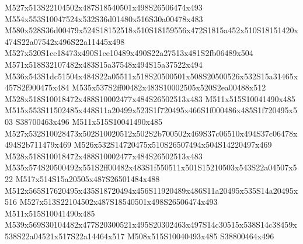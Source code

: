\documentclass{article}
\begin{document}
\begin{multicols}{2}






M527x513S22104502x487S18540501x498S26506474x493 M554x553S10047524x532S36d01480x516S30a00478x483 M580x528S36d00479x524S18152518x510S18159556x472S1815a452x510S18151420x474S22a07542x496S22a11445x498 M527x520S1ce18473x490S1ce10489x490S22a27513x481S2fb06489x504 M571x518S32107482x483S15a37548x494S15a37522x494 M536x543S1dc51504x484S22a05511x518S20500501x508S20500526x532S15a31465x457S2f900475x484 M535x537S2ff00482x483S10002505x520S2ea00488x512 M528x518S10018472x488S10002477x484S26502513x483 M511x515S10041490x485 M515x553S11502485x448S11a20499x523S1f720495x466S1f000486x485S1f720495x503 S38700463x496 M511x515S10041490x485 M527x532S10028473x502S10020512x502S2b700502x469S37c06510x494S37c06478x494S2b711479x469 M526x532S14720475x510S26507494x504S14220497x469 M528x518S10018472x488S10002477x484S26502513x483 M535x574S20500492x551S2ff00482x483S1f550511x501S15210503x543S22a04507x522 M517x514S15a20505x487S26501484x488 M512x565S17620495x435S18720494x456S11920489x486S11a20495x535S14a20495x516 M527x513S22104502x487S18540501x498S26506474x493 M511x515S10041490x485 M539x569S30104482x477S20300521x495S20302463x497S14c30515x538S14c38459x538S22a04521x517S22a14464x517 M508x515S10040493x485 S38800464x496



\end{multicols}
\end{document}

